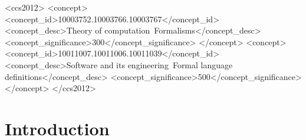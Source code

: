 \documentclass[acmsmall]{acmart}
\begin{document}
  
\begin{CCSXML}
  <ccs2012>  
  <concept>  
   <concept_id>10003752.10003766.10003767</concept_id>  
   <concept_desc>Theory of computation~Formalisms</concept_desc>  
   <concept_significance>300</concept_significance>  
   </concept>  
  <concept>  
   <concept_id>10011007.10011006.10011039</concept_id>  
   <concept_desc>Software and its engineering~Formal language definitions</concept_desc>  
   <concept_significance>500</concept_significance>  
   </concept>  
 </ccs2012>
\end{CCSXML}




\maketitle

\section{Introduction}
\label{sec:intro}

\end{document}
